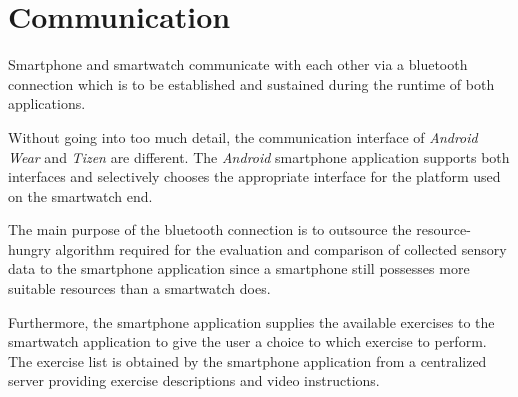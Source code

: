 \section{Communication}

Smartphone and smartwatch communicate with each other via a bluetooth
connection which is to be established and sustained during the runtime of both
applications.

Without going into too much detail, the communication interface
of \textit{Android Wear} and \textit{Tizen} are different. The \textit{Android}
smartphone application supports both interfaces and selectively chooses the
appropriate interface for the platform used on the smartwatch end.

The main purpose of the bluetooth connection is to outsource the
resource-hungry algorithm required for the evaluation and comparison of
collected sensory data to the smartphone application since a smartphone still
possesses more suitable resources than a smartwatch does.

Furthermore, the smartphone application supplies the available exercises to
the smartwatch application to give the user a choice to which exercise to
perform. The exercise list is obtained by the smartphone application from a
centralized server providing exercise descriptions and video instructions.
